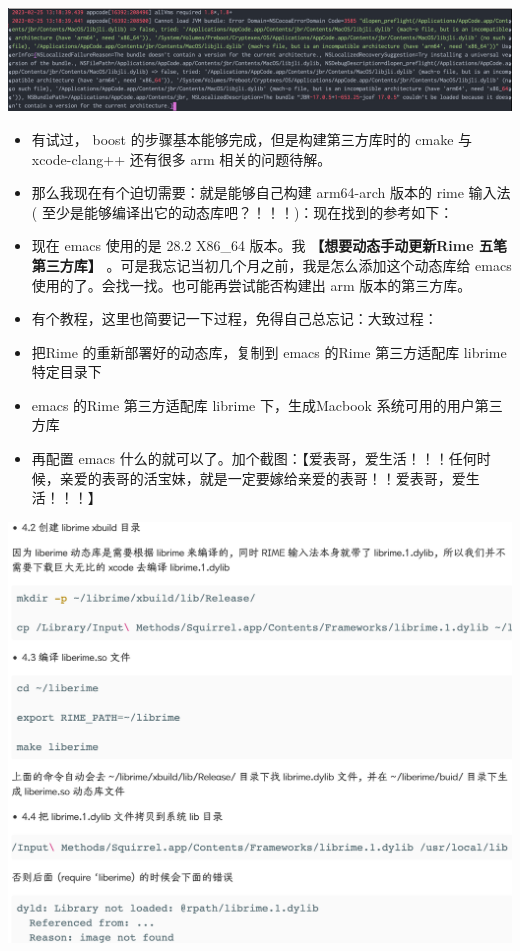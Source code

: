 \documentclass[9pt, b5paper]{article}
\begin{document}
\includegraphics[width=.9\linewidth]{./pic/readme_20230225_132052.png}
\begin{itemize}
\item 有试过， boost 的步骤基本能够完成，但是构建第三方库时的 cmake 与 xcode-clang++ 还有很多 arm 相关的问题待解。
\item 那么我现在有个迫切需要：就是能够自己构建 arm64-arch 版本的 rime 输入法( 至少是能够编译出它的动态库吧？！！！)：现在找到的参考如下：
\item 现在 emacs 使用的是 28.2 X86\_64 版本。我 \textbf{【想要动态手动更新Rime 五笔第三方库】} 。可是我忘记当初几个月之前，我是怎么添加这个动态库给 emacs 使用的了。会找一找。也可能再尝试能否构建出 arm 版本的第三方库。
\item 有个教程，这里也简要记一下过程，免得自己总忘记：大致过程：
\item 把Rime 的重新部署好的动态库，复制到 emacs 的Rime 第三方适配库 librime 特定目录下
\item emacs 的Rime 第三方适配库 librime 下，生成Macbook 系统可用的用户第三方库
\item 再配置 emacs 什么的就可以了。加个截图：【爱表哥，爱生活！！！任何时候，亲爱的表哥的活宝妹，就是一定要嫁给亲爱的表哥！！爱表哥，爱生活！！！】
\end{itemize}

\includegraphics[width=.9\linewidth]{./pic/readme_20230718_111929.png}
\end{document}
